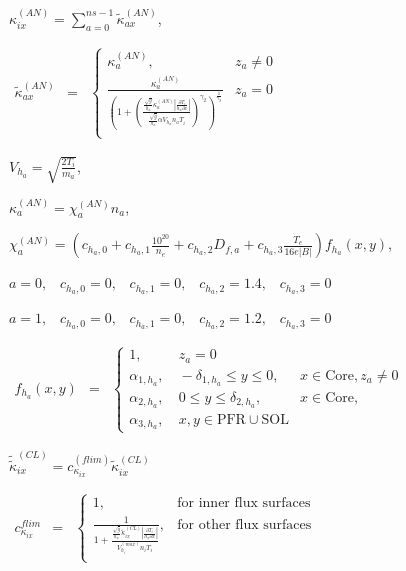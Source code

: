 \documentclass[a4paper,10pt]{report}
\begin{document}
$\kappa_{ix}^{(AN)} = \sum \limits_{a = 0}^{ns - 1} \widetilde \kappa_{ax}^{(AN)}$,


$
\begin{matrix}
\widetilde{\kappa}_{ax}^{(AN)} & =
& \left\{
\begin{matrix}
\kappa_a^{(AN)}, & z_a \neq 0 \\
\frac {\kappa_a^{(AN)}}
{\left(
	1 + \left(
			\frac{ \frac{\sqrt{g}}{h_x} \kappa_a^{(AN)} \left| \frac{\partial T_i}{h_x \partial x} \right|}
			{\frac{\sqrt{g}}{h_x} \alpha V_{h_a} n_a T_i}
		\right)^{\gamma_2}
\right)^{\frac 1{\gamma_2}}}
& z_a = 0 \\
\end{matrix} \right.
\end{matrix}
$

$V_{h_a} = \sqrt{\frac{2 T_i}{m_a}}$,

$\kappa_a^{(AN)} = \chi_a^{(AN)} n_a$,

$\chi_a^{(AN)} = \left(
c_{h_a,0} + c_{h_a,1} \frac{10^{20}}{n_e} + c_{h_a,2} D_{f,a} + c_{h_a,3}\frac{T_e}{16 e|B|}
\right) f_{h_a} (x,y)$,


$ a = 0, \;\;\;  c_{h_a,0} = 0, \;\;\;  c_{h_a,1} = 0, \;\;\;  c_{h_a,2} = 1.4,  \;\;\;  c_{h_a,3} = 0$

$ a = 1, \;\;\;  c_{h_a,0} = 0, \;\;\;  c_{h_a,1} = 0, \;\;\;  c_{h_a,2} = 1.2,  \;\;\;  c_{h_a,3} = 0$

$
\begin{matrix}
f_{h_a}(x,y) & =
& \left\{
\begin{matrix}
1, & \ z_a = 0 \\
\alpha_{1,h_a}, & \ -\delta_{1,h_a} \le y \le 0, & x \in \text{Core}, z_a \neq 0 \\
\alpha_{2,h_a}, & \ 0\le y\le \delta_{2,h_a}, & x \in \text{Core}, \\
\alpha_{3,h_a}, & \ x,y\in \text{PFR} \cup \text{SOL}
\end{matrix} \right.
\end{matrix}
$

$\widetilde{\widetilde{\kappa}}_{ix}^{(CL)} = c_{\kappa_{ix}}^{(flim)} \widetilde{\kappa}_{ix}^{(CL)}$

$
\begin{matrix}
c_{\kappa_{ix}}^{flim} & =
& \left\{
\begin{matrix}
1, & \text{for inner flux surfaces} \\
\frac 1 {
	1 + \frac{
	\frac{\sqrt g}{h_x} \widetilde{\kappa}_{ix}^{(CL)}
	\left|
		\frac{\partial T_i}{h_x \partial x}
	\right|}
	{ V_{h_i}^{(max)} n_i T_i}
},
&  \text{for other flux surfaces} \\
\end{matrix} \right.
\end{matrix}
$
\end{document}
